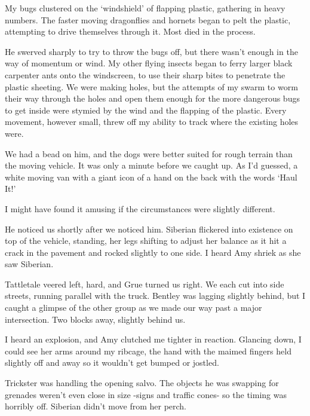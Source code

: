 My bugs clustered on the `windshield' of flapping plastic, gathering in heavy numbers.  The faster moving dragonflies and hornets began to pelt the plastic, attempting to drive themselves through it.  Most died in the process.



He swerved sharply to try to throw the bugs off, but there wasn't enough in the way of momentum or wind.  My other flying insects began to ferry larger black carpenter ants onto the windscreen, to use their sharp bites to penetrate the plastic sheeting.  We were making holes, but the attempts of my swarm to worm their way through the holes and open them enough for the more dangerous bugs to get inside were stymied by the wind and the flapping of the plastic.  Every movement, however small, threw off my ability to track where the existing holes were.



We had a bead on him, and the dogs were better suited for rough terrain than the moving vehicle.  It was only a minute before we caught up.  As I'd guessed, a white moving van with a giant icon of a hand on the back with the words `Haul It!'



I might have found it amusing if the circumstances were slightly different.



He noticed us shortly after we noticed him.  Siberian flickered into existence on top of the vehicle, standing, her legs shifting to adjust her balance as it hit a crack in the pavement and rocked slightly to one side.  I heard Amy shriek as she saw Siberian.



Tattletale veered left, hard, and Grue turned us right.  We each cut into side streets, running parallel with the truck.  Bentley was lagging slightly behind, but I caught a glimpse of the other group as we made our way past a major intersection.  Two blocks away, slightly behind us.



I heard an explosion, and Amy clutched me tighter in reaction.  Glancing down, I could see her arms around my ribcage, the hand with the maimed fingers held slightly off and away so it wouldn't get bumped or jostled.



Trickster was handling the opening salvo.  The objects he was swapping for grenades weren't even close in size -signs and traffic cones- so the timing was horribly off.  Siberian didn't move from her perch.



